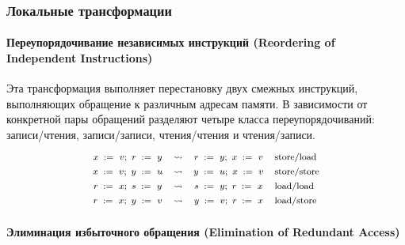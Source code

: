\subsubsection{Локальные трансформации}

\paragraph{
Переупорядочивание независимых инструкций
(Reordering of Independent Instructions)
} 

Эта трансформация выполняет перестановку 
двух смежных инструкций, выполняющих обращение к 
различным адресам памяти. 
В зависимости от конкретной пары обращений разделяют 
четыре класса переупорядочиваний:
записи/чтения, записи/записи,
чтения/чтения и чтения/записи. 
%
\[\def\arraystretch{1.4}\footnotesize
  \begin{array}{cccl} 

      \writeInst{}{x}{v} \seq \readInst{}{r}{y} 
    & \leadsto 
    & \readInst{}{r}{y} \seq \writeInst{}{x}{v}
    & \text{store/load}  \\ 

      \writeInst{}{x}{v} \seq \writeInst{}{y}{u} 
    & \leadsto 
    & \writeInst{}{y}{u} \seq \writeInst{}{x}{v}
    & \text{store/store}  \\ 

      \readInst{}{r}{x} \seq \readInst{}{s}{y} 
    & \leadsto 
    & \readInst{}{s}{y} \seq \readInst{}{r}{x}
    & \text{load/load}  \\ 

      \readInst{}{r}{x} \seq \writeInst{}{y}{v} 
    & \leadsto 
    & \writeInst{}{y}{v} \seq \readInst{}{r}{x}
    & \text{load/store}  \\ 

  \end{array}
\]

\paragraph{
Элиминация избыточного обращения
(Elimination of Redundant Access)
} 

